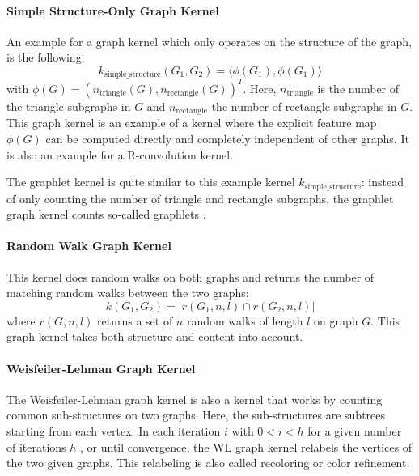 \paragraph{Simple Structure-Only Graph Kernel}
An example for a graph kernel which only operates on the structure of the graph, is the following:
\begin{equation*}
k_{\mathrm{simple\_structure}}(G_1, G_2) = \langle \phi(G_1), \phi(G_1) \rangle
\end{equation*}
with $\phi(G) = (n_{\mathrm{triangle}}(G), n_{\mathrm{rectangle}}(G))^T$. Here, $n_{\mathrm{triangle}}$ is the number of the triangle subgraphs in $G$ and $n_{\mathrm{rectangle}}$ the number of rectangle subgraphs in $G$.
This graph kernel is an example of a kernel where the explicit feature map $\phi(G)$ can be computed directly and completely independent of other graphs.
It is also an example for a R-convolution kernel.

The graphlet kernel \cite{Shervashidze2009a} is quite similar to this example kernel $k_{\mathrm{simple\_structure}}$: instead of only counting the number of triangle and rectangle subgraphs, the graphlet graph kernel counts so-called graphlets \cite{Shervashidze2009a}.

\paragraph{Random Walk Graph Kernel}
This kernel does random walks on both graphs and returns the number of matching random walks between the two graphs:
\begin{equation*}
    k(G_1, G_2) = |r(G_1, n, l) \cap r(G_2, n, l)|
\end{equation*}
where $r(G, n, l)$ returns a set of $n$ random walks of length $l$ on graph $G$.
This graph kernel takes both structure and content into account.

\paragraph{Weisfeiler-Lehman Graph Kernel}
The Weisfeiler-Lehman graph kernel is also a kernel that works by counting common sub-structures on two graphs.
Here, the sub-structures are subtrees starting from each vertex.
In each iteration $i$ with $0 < i < h$ for a given number of iterations $h$ , or until convergence, the WL graph kernel relabels the vertices of the two given graphs.
This relabeling is also called recoloring or color refinement.

